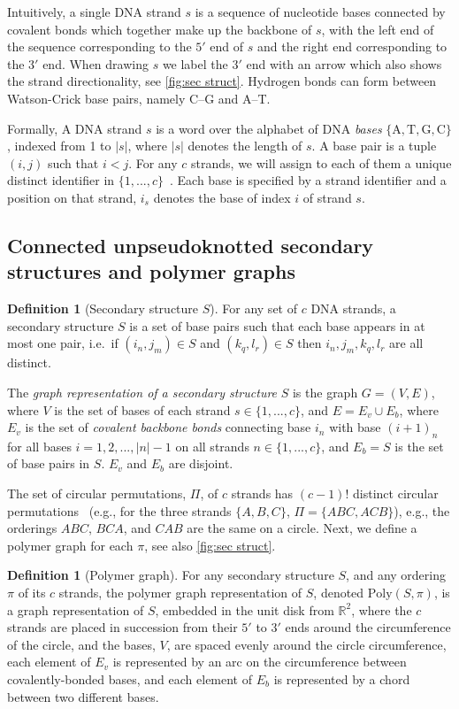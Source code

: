 \documentclass[11pt,letterpaper]{article}  \usepackage[margin=1in]{geometry}
\theoremstyle{definition}  \newtheorem{Definition}[theorem]{Definition}
\newcommand{\PolySpi}{\ensuremath{\mathrm{Poly}(S,\pi)}\xspace}
\begin{document}
Intuitively, a single DNA strand $s$ is a sequence of nucleotide bases connected by covalent bonds which together make up the backbone of $s$, with the left end of the sequence corresponding to the $5'$ end of $s$ and the right end corresponding to the $3'$ end. When drawing $s$ we label  the $3'$ end with an arrow which also shows the strand directionality, see \cref{fig:sec struct}. Hydrogen bonds can form between Watson-Crick base pairs, namely C–G and A–T.

Formally, A DNA strand $s$ is a word over the alphabet of DNA {\em bases} $\{\mathrm{A},\mathrm{T},\mathrm{G},\mathrm{C}\}$, indexed from 1 to $|s|$, where $|s|$ denotes the length of $s$.
A base pair is a tuple $(i, j)$ such that $i<j$. 
For any $c$ strands, we will assign to each of them a unique distinct identifier in $\{1, . . . ,c\}$~\cite{dirks2007thermodynamic}. Each base is specified by a strand identifier and a position on that strand, $i_s$ denotes the base of index $i$ of strand $s$.

\subsection{Connected unpseudoknotted secondary structures and  polymer graphs}

\begin{Definition}[Secondary structure $S$]
	For any set of $c$ DNA strands, a secondary structure $S$ is a set of base pairs such that each base appears in at most one pair, i.e.~if $(i_n, j_m)\in S$ and $(k_q, l_r)\in S$ then $i_n,j_m,k_q,l_r$ are all distinct.
\end{Definition}
The {\em graph representation of a  secondary structure} $S$
is the graph $G=(V,E)$, where $V$ is the set of bases of each strand $s \in \{1, . . . ,c\}$, and $E = E_v \cup E_b$, where $E_v$ is the set of \emph{covalent backbone bonds} connecting base $i_n$ with base $(i+1)_n$ for all bases $i = 1,2, ..., |n|-1$ on all strands $n \in \{1, . . . ,c\}$, and $E_b = S$ is the set of base pairs in $S$. $E_v$ and $E_b$ are disjoint.

The set of circular permutations, $\Pi$, of $c$ strands has $(c-1)!$ distinct circular permutations~\cite{brualdi1977introductory} (e.g., for the three strands $\{A, B, C\}$, $\Pi = \{A B C, ACB\}$), 
e.g., the orderings $ABC$, $BCA$, and $CAB$ are the same on a circle. 
Next, we define a  polymer graph for each $\pi$, see also  \cref{fig:sec struct}.

\begin{Definition}[Polymer graph]
	For any secondary structure $S$, and any ordering $\pi$ of its $c$ strands, the polymer graph representation of $S$,  denoted  \PolySpi, is a graph representation of $S$, embedded in the unit disk from $\mathbb{R}^2$, where the $c$ strands are placed in succession from their $5'$ to $3'$ ends around the circumference of the circle, and the bases, $V$, are spaced evenly around the circle circumference, each element of $E_v$ is represented by an arc on the circumference between covalently-bonded bases, and each element of $E_b$ is represented by a chord between two different bases. 
\end{Definition}
\end{document}
